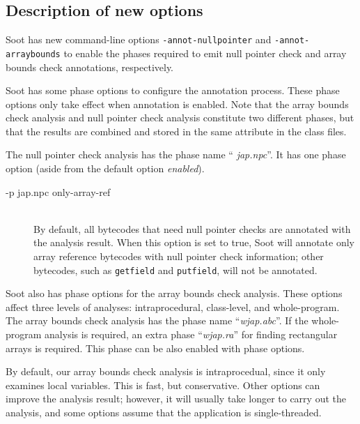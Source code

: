 \documentclass{article}
\begin{document}
\subsection{Description of new options}

Soot has new command-line options {\tt-annot-nullpointer} and
{\tt-annot-arraybounds} to enable the phases required to emit
null pointer check and array bounds check annotations, respectively.

Soot has some phase options to configure the annotation process.
These phase options only take effect when annotation is enabled.  
Note that the array bounds check analysis and null pointer
check analysis constitute two different phases, but that the results
are combined and stored in the same attribute in the class files. 

The null pointer check analysis has the phase name ``{\em
jap.npc}''. It has one phase option (aside from the default option
{\em enabled}).

\begin{description}

\item[-p jap.npc only-array-ref]\ \\
  By default, all bytecodes that need null pointer checks are 
  annotated with the analysis result. When this option is set to true, 
  Soot will annotate only array reference bytecodes with null 
  pointer check information; other bytecodes, such as {\tt getfield} 
  and {\tt putfield}, will not be annotated. 
\end{description}

Soot also has phase options for the array bounds check analysis.
These options affect three levels of analyses: intraprocedural,
class-level, and whole-program. The array bounds check analysis has
the phase name ``{\em wjap.abc}''.  If the whole-program analysis is
required, an extra phase ``{\em wjap.ra}'' for finding rectangular
arrays is required.  This phase can be also enabled with
phase options.

By default, our array bounds check analysis is intraprocedual, since
it only examines local variables. This is fast, but
conservative. Other options can improve the analysis result; however,
it will usually take longer to carry out the analysis, and some
options assume that the application is single-threaded.
  
\end{document}
